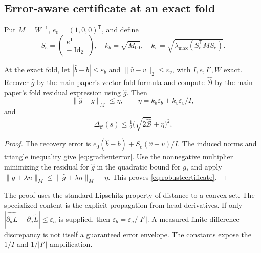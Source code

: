 \subsection{Error-aware certificate at an exact fold}
Put $M=W^{-1}$, $e_0=(1,0,0)^{\mathsf T}$, and define
\begin{equation}
 S_e=\begin{pmatrix}e^{\mathsf T}\\-\operatorname{Id}_2\end{pmatrix},\quad
 k_b=\sqrt{M_{00}},\quad k_v=\sqrt{\lambda_{\max}(S_e^{\mathsf T}MS_e)}.
 \label{eq:errorconstants}
\end{equation}
\begin{proposition}
\label{prop:robust}
At the exact fold, let $|\widehat b-b|\leq\varepsilon_b$ and $\|\widehat v-v\|_2\leq\varepsilon_v$, with $I,e,I',W$ exact. Recover $\widehat g$ by the main paper's vector fold formula and compute $\widehat{\mathcal B}$ by the main paper's fold residual expression using $\widehat g$. Then
\begin{equation}
 \|\widehat g-g\|_M\leq\eta,
 \qquad\eta=k_b\varepsilon_b+k_v\varepsilon_v/I,
 \label{eq:gradienterror}
\end{equation}
and
\begin{equation}
 \Delta_{\mathcal C}(s)\leq
 \tfrac12\bigl(\sqrt{2\widehat{\mathcal B}}+\eta\bigr)^2.
 \label{eq:robustcertificate}
\end{equation}
\end{proposition}
\begin{proof}
The recovery error is $e_0(\widehat b-b)+S_e(\widehat v-v)/I$. The induced norms and triangle inequality give \eqref{eq:gradienterror}. Use the nonnegative multiplier minimizing the residual for $\widehat g$ in the quadratic bound for $g$, and apply $\|g+\lambda n\|_M\leq\|\widehat g+\lambda n\|_M+\eta$. This proves \eqref{eq:robustcertificate}.
\end{proof}
The proof uses the standard Lipschitz property of distance to a convex set. The specialized content is the explicit propagation from head derivatives. If only $|\widehat{\partial_a\widetilde L}-\partial_a\widetilde L|\leq\varepsilon_a$ is supplied, then $\varepsilon_b=\varepsilon_a/|I'|$. A measured finite-difference discrepancy is not itself a guaranteed error envelope. The constants expose the $1/I$ and $1/|I'|$ amplification.


